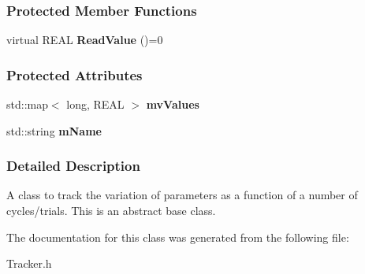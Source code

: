 \subsubsection*{Protected Member Functions}
\begin{DoxyCompactItemize}
\item 
virtual REAL {\bfseries ReadValue} ()=0\label{a00106_a14096d99b76d3ffac16553f6434f97ce}

\end{DoxyCompactItemize}
\subsubsection*{Protected Attributes}
\begin{DoxyCompactItemize}
\item 
std::map$<$ long, REAL $>$ {\bfseries mvValues}\label{a00106_adcd7db9240b7c6432a1fe2f0daec2d24}

\item 
std::string {\bfseries mName}\label{a00106_a64fee6086f7c35c89c72d703903a1b26}

\end{DoxyCompactItemize}


\subsubsection{Detailed Description}
A class to track the variation of parameters as a function of a number of cycles/trials. This is an abstract base class. 

The documentation for this class was generated from the following file:\begin{DoxyCompactItemize}
\item 
Tracker.h\end{DoxyCompactItemize}
